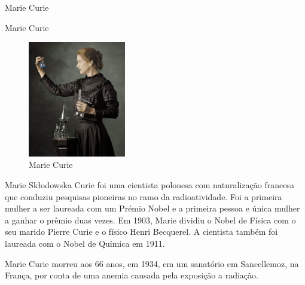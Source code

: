 \documentclass[presentation]{beamer}
\begin{document}
\begin{frame}[label={sec:org3ab0f21}]{Marie Curie}
\begin{block}{Marie Curie}
\vspace{-1.5cm}
\begin{figure}
\centering
\includegraphics[width=0.38\textwidth]{./Marie.jpeg}
\caption{Marie Curie}
\end{figure}

Marie Skłodowska Curie foi uma cientista polonesa com naturalização francesa que conduziu pesquisas pioneiras no ramo da radioatividade. Foi a primeira mulher a ser laureada com um Prémio Nobel e a primeira pessoa e única mulher a ganhar o prêmio duas vezes. Em 1903, Marie dividiu o Nobel de \alert{Física} com o seu marido Pierre Curie e o físico Henri Becquerel. A cientista também foi laureada com o Nobel de \alert{Química} em 1911.

Marie Curie morreu aos 66 anos, em 1934, em um sanatório em Sancellemoz, na França, por conta de uma anemia causada pela exposição a radiação.
\end{block}
\end{frame}
\end{document}

